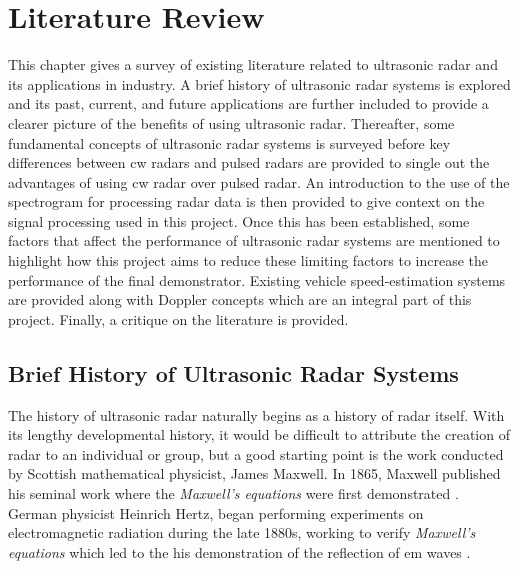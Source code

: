 \documentclass[class=report,11pt,crop=false]{standalone}
\begin{document}
\ifstandalone
\tableofcontents
\fi
\chapter{Literature Review \label{ch:literature}}
\vspace{-1cm}
This chapter gives a survey of existing literature related to ultrasonic radar and its applications in industry. A brief history of ultrasonic radar systems is explored and its past, current, and future applications are further included to provide a clearer picture of the benefits of using ultrasonic radar. Thereafter, some fundamental concepts of ultrasonic radar systems is surveyed before key differences between \gls{cw} radars and pulsed radars are provided to single out the advantages of using \gls{cw} radar over pulsed radar. An introduction to the use of the spectrogram for processing radar data is then provided to give context on the signal processing used in this project. Once this has been established, some factors that affect the performance of ultrasonic radar systems are mentioned to highlight how this project aims to reduce these limiting factors to increase the performance of the final demonstrator. Existing vehicle speed-estimation systems are provided along with Doppler concepts which are an integral part of this project. Finally, a critique on the literature is provided.

\section{Brief History of Ultrasonic Radar Systems}
The history of ultrasonic \gls{radar} naturally begins as a history of \gls{radar} itself. With its lengthy developmental history, it would be difficult to attribute the creation of \gls{radar} to an individual or group, but a good starting point is the work conducted by Scottish mathematical physicist, James Maxwell. In 1865, Maxwell published his seminal work where the \emph{Maxwell's equations} were first demonstrated \cite{maxwell}. German physicist Heinrich Hertz, began performing experiments on electromagnetic radiation during the late 1880s, working to verify \emph{Maxwell's equations} which led to the his demonstration of the reflection of \gls{em} waves \cite{hertz, cichon}. 
\end{document}
